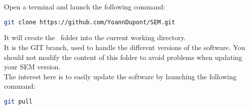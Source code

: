 \documentclass[manual-fr.tex]{subfiles}
\begin{document}
Open a terminal and launch the following command:

\begin{lstlisting}[language=Bash]
git clone https://github.com/YoannDupont/SEM.git
\end{lstlisting}

It will create the \SEM\ folder into the current working directory.\\ 

It is the GIT branch, used to handle the different versions of the software. You should not modify the content of this folder to avoid problems when updating your SEM version.\\

The interest here is to easily update the software by launching the following command:

\begin{lstlisting}[language=Bash]
git pull
\end{lstlisting}
\end{document}
